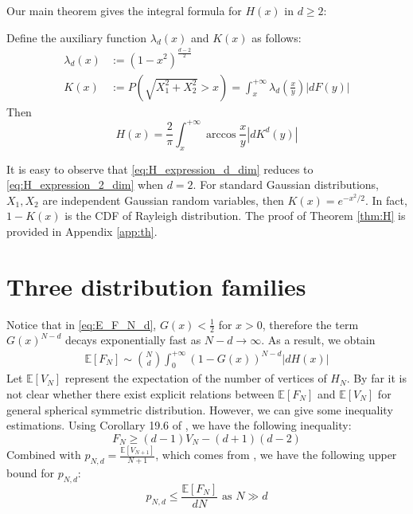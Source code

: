 \documentclass{aptpub}
\def\E{\mathbb{E}}
\begin{document}
Our main theorem gives the integral formula for $H(x)$ in $d\geq 2$:
\begin{theorem}\label{thm:H}
Define the auxiliary function $\lambda_d(x)$ and $K(x)$ as follows: 
     \begin{align}
          \lambda_d(x) & :=(1-x^2)^{\frac{d-2}{2}}
          \label{eq:lambda_r}\\
          K(x) &:=P(\sqrt{X_1^2+X_2^2}>x)=
          \int_x^{+\infty}
          \lambda_d \left(\frac{x}{y} \right)|dF(y)|
          \label{eq:K_x}
      \end{align}
Then
\begin{equation}
     H(x) = \frac{2}{\pi}
     \int_x^{+\infty} \arccos\frac{x}{y}
     |d K^d(y)|\label{eq:H_expression_d_dim}
\end{equation}
\end{theorem}
It is easy to observe that \eqref{eq:H_expression_d_dim} reduces to 
\eqref{eq:H_expression_2_dim} when $d=2$.
For standard Gaussian distributions, $X_1, X_2$ are independent
Gaussian random variables, then $K(x) = e^{-x^2/2}$. In fact, $1-K(x)$ is the CDF of Rayleigh distribution.
The proof of Theorem \ref{thm:H}
is provided in Appendix \ref{app:th}.

\section{Three distribution families}\label{sec:three_distriutions}
Notice that in \eqref{eq:E_F_N_d}, $G(x)<\frac{1}{2}$ for $x>0$, therefore the
term $G(x)^{N-d}$ decays exponentially fast as $N-d\to \infty$.
As a result, we obtain
\begin{align}
     \E[F_N] \sim \binom{N}{d} \int_0^{+\infty} 
      (1-G(x))^{N-d} |dH(x)| 
     \label{eq:E_F_N_d_sim}
\end{align}
Let $\E[V_N]$ represent the expectation of the number of
vertices of $H_N$.
By far it is not clear whether there exist explicit relations
between $\E[F_N]$ and $\E[V_N]$
for general spherical symmetric distribution.
However, we can give some inequality estimations.
Using Corollary 19.6 of \cite{brondsted2012introduction}, we have the following
inequality:
\begin{equation}\label{eq:F_V_upper}
     F_N \geq (d-1) V_N - (d+1)(d-2)
 \end{equation}
Combined with $p_{N,d} = \frac{\E[V_{N+1}]}{N+1}$, which comes from
\cite{efron1965convex}, we have the following upper bound for $p_{N,d}$:
\begin{equation}\label{eq:p_N_d_bound}
    p_{N,d} \leq \frac{\E[F_N]}{d N} \textrm{ as } N \gg d
\end{equation}
\end{document}
